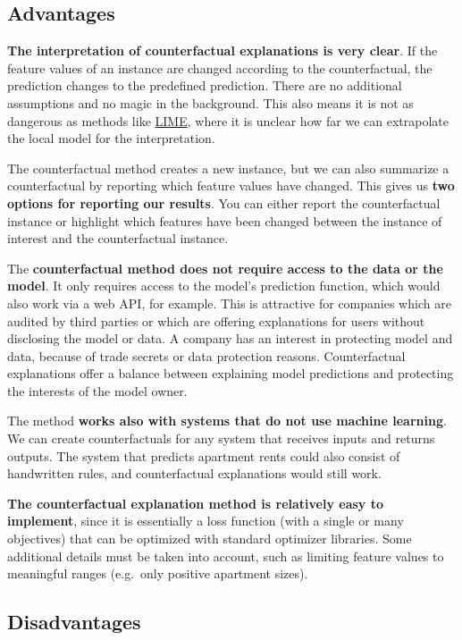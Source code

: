 \documentclass[
  11pt,
]{scrbook}
\begin{document}
\hypertarget{advantages-14}{%
\subsection{Advantages}\label{advantages-14}}

\textbf{The interpretation of counterfactual explanations is very clear}.
If the feature values of an instance are changed according to the counterfactual, the prediction changes to the predefined prediction.
There are no additional assumptions and no magic in the background.
This also means it is not as dangerous as methods like \protect\hyperlink{lime}{LIME}, where it is unclear how far we can extrapolate the local model for the interpretation.

The counterfactual method creates a new instance, but we can also summarize a counterfactual by reporting which feature values have changed.
This gives us \textbf{two options for reporting our results}.
You can either report the counterfactual instance or highlight which features have been changed between the instance of interest and the counterfactual instance.

The \textbf{counterfactual method does not require access to the data or the model}.
It only requires access to the model's prediction function, which would also work via a web API, for example.
This is attractive for companies which are audited by third parties or which are offering explanations for users without disclosing the model or data.
A company has an interest in protecting model and data, because of trade secrets or data protection reasons.
Counterfactual explanations offer a balance between explaining model predictions and protecting the interests of the model owner.

The method \textbf{works also with systems that do not use machine learning}.
We can create counterfactuals for any system that receives inputs and returns outputs.
The system that predicts apartment rents could also consist of handwritten rules, and counterfactual explanations would still work.

\textbf{The counterfactual explanation method is relatively easy to implement}, since it is essentially a loss function (with a single or many objectives) that can be optimized with standard optimizer libraries.
Some additional details must be taken into account, such as limiting feature values to meaningful ranges (e.g.~only positive apartment sizes).

\hypertarget{disadvantages-14}{%
\subsection{Disadvantages}\label{disadvantages-14}}
\end{document}
